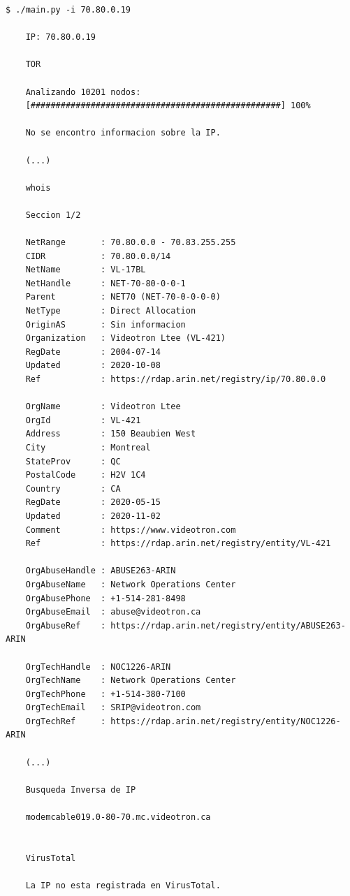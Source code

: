                \begin{lstlisting}[style=bash_style, basicstyle=\ttfamily\scriptsize, caption={Fragmento de la salida del proyecto \texttt{ip-osint}.}]
    $ ./main.py -i 70.80.0.19

    IP: 70.80.0.19

    TOR
    
    Analizando 10201 nodos:
    [##################################################] 100% 	
    
    No se encontro informacion sobre la IP.

    (...)

    whois
    
    Seccion 1/2
    
    NetRange       : 70.80.0.0 - 70.83.255.255
    CIDR           : 70.80.0.0/14
    NetName        : VL-17BL
    NetHandle      : NET-70-80-0-0-1
    Parent         : NET70 (NET-70-0-0-0-0)
    NetType        : Direct Allocation
    OriginAS       : Sin informacion
    Organization   : Videotron Ltee (VL-421)
    RegDate        : 2004-07-14
    Updated        : 2020-10-08
    Ref            : https://rdap.arin.net/registry/ip/70.80.0.0
    
    OrgName        : Videotron Ltee
    OrgId          : VL-421
    Address        : 150 Beaubien West
    City           : Montreal
    StateProv      : QC
    PostalCode     : H2V 1C4
    Country        : CA
    RegDate        : 2020-05-15
    Updated        : 2020-11-02
    Comment        : https://www.videotron.com
    Ref            : https://rdap.arin.net/registry/entity/VL-421
    
    OrgAbuseHandle : ABUSE263-ARIN
    OrgAbuseName   : Network Operations Center
    OrgAbusePhone  : +1-514-281-8498
    OrgAbuseEmail  : abuse@videotron.ca
    OrgAbuseRef    : https://rdap.arin.net/registry/entity/ABUSE263-ARIN
    
    OrgTechHandle  : NOC1226-ARIN
    OrgTechName    : Network Operations Center
    OrgTechPhone   : +1-514-380-7100
    OrgTechEmail   : SRIP@videotron.com
    OrgTechRef     : https://rdap.arin.net/registry/entity/NOC1226-ARIN

    (...)
    
    Busqueda Inversa de IP
    
    modemcable019.0-80-70.mc.videotron.ca
    
    
    VirusTotal
    
    La IP no esta registrada en VirusTotal.                    
                \end{lstlisting}

